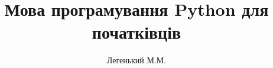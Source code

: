 



\usepackage{cmap}					%
\usepackage{mathtext} 				%
\usepackage[T2A]{fontenc}			%
\usepackage[english,ukrainian]{babel}	%
\usepackage{amsmath}
\usepackage{amsfonts}
\usepackage{amssymb}

\usepackage{hyperref}

\usepackage{graphicx}  %
\graphicspath{{images/}{images2/}}  %
\setlength\fboxsep{3pt} %
\setlength\fboxrule{1pt} %
\usepackage{wrapfig} %

\usepackage{array,tabularx,tabulary,booktabs} %
\usepackage{longtable}  %
\usepackage{multirow} %

\usepackage{etoolbox} %

\usepackage{lastpage} %
\usepackage{soul} %
\usepackage{csquotes} %
\usepackage{multicol} %

\usepackage{tikz} %
\usepackage{pgfplots}
\usepackage{pgfplotstable}

\title[Python]{Мова програмування Python для початківців}
\author{Легенький М.М.}

